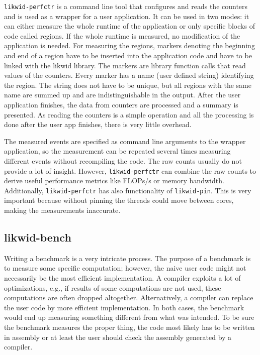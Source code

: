 \texttt{likwid-perfctr} is a command line tool that configures and reads the counters and is used as a wrapper for a user application.
It can be used in two modes: it can either measure the whole runtime of the application or only specific blocks of code called regions.
If the whole runtime is measured, no modification of the application is needed.
For measuring the regions, markers denoting the beginning and end of a region have to be inserted into the application code and have to be linked with the likwid library. The markers are library function calls that read values of the counters. 
Every marker has a name (user defined string) identifying the region. The string does not have to be unique, but all regions with the same name are summed up and are indistinguishable in the output. 
After the user application finishes, the data from counters are processed and a summary is presented. As reading the counters is a simple operation and all the processing is done after the user app finishes, there is very little overhead.

The measured events are specified as command line arguments to the wrapper application, so the measurement can be repeated several times measuring different events without recompiling the code.
The raw counts usually do not provide a lot of insight. However, \texttt{likwid-perfctr} can combine the raw counts to derive useful performance metrics like FLOPs/s or memory bandwidth.
%
Additionally, \texttt{likwid-perfctr} has also functionality of \texttt{likwid-pin}. This is very important because without pinning the threads could move between cores, making the measurements inaccurate.

\subsection*{likwid-bench}

Writing a benchmark is a very intricate process. The purpose of a benchmark is to measure some specific computation; however, the naive user code might not necessarily be the most efficient implementation. A compiler exploits a lot of optimizations, e.g., if results of some computations are not used, these computations are often dropped altogether. Alternatively, a compiler can replace the user code by more efficient implementation. In both cases, the benchmark would end up measuring something different from what was intended.
To be sure the benchmark measures the proper thing, the code most likely has to be written in assembly or at least the user should check the assembly generated by a compiler.

